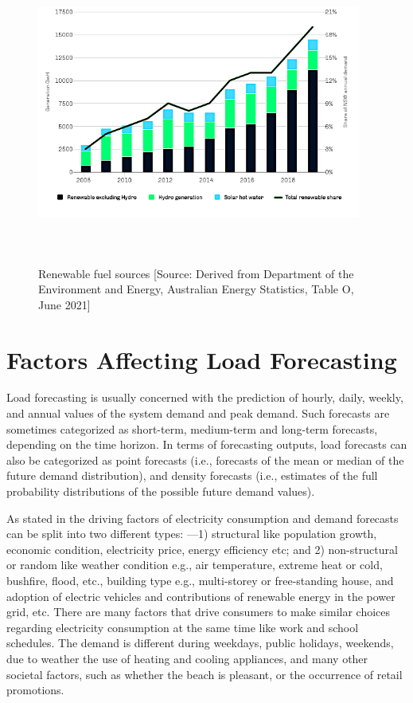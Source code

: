 \documentclass[mstat,12pt]{unswthesis}
\begin{document}
\begin{figure}[H]
\centering
\includegraphics[width=0.95\textwidth,height=10cm]{renewable_fuel_sources_chart.png}
\caption{Renewable fuel sources [Source:
Derived from Department of the Environment and Energy, Australian Energy Statistics, Table O, June 2021]}\label{renewable}
\end{figure}

\section{Factors Affecting Load
Forecasting}\label{factors-affecting-load-forecasting}

Load forecasting is usually concerned with the prediction of hourly,
daily, weekly, and annual values of the system demand and peak demand.
Such forecasts are sometimes categorized as short-term, medium-term and
long-term forecasts, depending on the time horizon. In terms of
forecasting outputs, load forecasts can also be categorized as point
forecasts (i.e., forecasts of the mean or median of the future demand
distribution), and density forecasts (i.e., estimates of the full
probability distributions of the possible future demand values).

As stated in \cite{nsw_epa_2021_energy_consumption} the driving factors
of electricity consumption and demand forecasts can be split into two
different types: ---1) structural like population growth, economic
condition, electricity price, energy efficiency etc; and 2)
non-structural or random like weather condition e.g., air temperature,
extreme heat or cold, bushfire, flood, etc., building type e.g.,
multi-storey or free-standing house, and adoption of electric vehicles
and contributions of renewable energy in the power grid, etc. There are
many factors that drive consumers to make similar choices regarding
electricity consumption at the same time like work and school schedules.
The demand is different during weekdays, public holidays, weekends, due
to weather the use of heating and cooling appliances, and many other
societal factors, such as whether the beach is pleasant, or the
occurrence of retail promotions.
\end{document}
